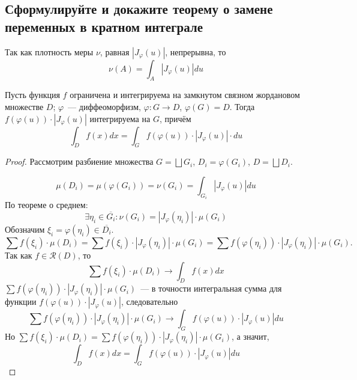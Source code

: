 
\subsection{Сформулируйте и докажите теорему о замене переменных в кратном интеграле}

Так как плотность меры $\nu$, равная $|J_\varphi(u)|$, непрерывна, то
\begin{equation*}
    \nu(A) = \int_A |J_\varphi(u)| du
\end{equation*}

\begin{theorem*}
    Пусть функция $f$ ограничена и интегрируема на замкнутом связном жордановом множестве $D$; $\varphi$~--- диффеоморфизм, $\varphi: G \to D$, $\varphi(G) = D$. Тогда $f(\varphi(u)) \cdot |J_\varphi(u)|$ интегрируема на $G$, причём 
    \begin{equation*}
        \int_D f(x)dx = \int_G f(\varphi(u)) \cdot |J_\varphi(u)| \cdot du
    \end{equation*}
\end{theorem*}
\begin{proof}
    Рассмотрим разбиение множества $G = \bigsqcup G_i$, $D_i = \varphi(G_i)$, $D = \bigsqcup D_i$. 

    \begin{equation*}
        \mu(D_i) = \mu(\varphi(G_i)) = \nu(G_i) = \int_{G_i} |J_\varphi(u)| du
    \end{equation*}
    По теореме о среднем:
    \begin{equation*}
        \exists \eta_i \in \overline{G_i}: \nu(G_i) = |J_\varphi(\eta_i)| \cdot \mu(G_i)
    \end{equation*}
    Обозначим $\xi_i = \varphi(\eta_i) \in \overline{D_i}$.
    \begin{equation*}
        \sum f(\xi_i) \cdot \mu(D_i) = \sum f(\xi_i) \cdot |J_\varphi(\eta_i)| \cdot \mu(G_i) = \sum f(\varphi(\eta_i)) \cdot |J_\varphi(\eta_i)| \cdot \mu(G_i).
    \end{equation*}
    Так как $f \in \mathcal{R}(D)$, то 
    \begin{equation*}
        \sum f(\xi_i) \cdot \mu(D_i) \to \int_D f(x) dx
    \end{equation*}
    $\sum f(\varphi(\eta_i)) \cdot |J_\varphi(\eta_i)| \cdot \mu(G_i)$~--- в точности интегральная сумма для функции $f(\varphi(u)) \cdot |J_\varphi(u)|$, следовательно
    \begin{equation*}
        \sum f(\varphi(\eta_i)) \cdot |J_\varphi(\eta_i)| \cdot \mu(G_i) \to \int_G f(\varphi(u)) \cdot |J_\varphi(u)| du
    \end{equation*}
    Но $\sum f(\xi_i) \cdot \mu(D_i) = \sum f(\varphi(\eta_i)) \cdot |J_\varphi(\eta_i)| \cdot \mu(G_i)$, а значит,
    \begin{equation*}
        \int_D f(x) dx = \int_G f(\varphi(u)) \cdot |J_\varphi(u)| du
    \end{equation*}
\end{proof}